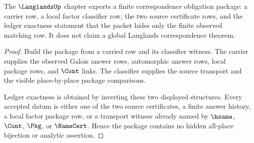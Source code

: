 \begin{theorem}
\label{thm:langlands-correspondence-obligation-package}
The $\LanglandsUp$ chapter exports a finite correspondence obligation package: a carrier row, a local factor classifier row, the two source certificate rows, and the ledger exactness statement that the packet hides only the finite observed matching row. It does not claim a global Langlands correspondence theorem.
\end{theorem}
\begin{proof}
Build the package from a carried row and its classifier witness. The carrier supplies the observed Galois answer rows, automorphic answer rows, local package rows, and $\Cont$ links. The classifier supplies the source transport and the visible place-by-place package comparisons.

Ledger exactness is obtained by inverting these two displayed structures. Every accepted datum is either one of the two source certificates, a finite answer history, a local factor package row, or a transport witness already named by $\hsame$, $\Cont$, $\Pkg$, or $\NameCert$. Hence the package contains no hidden all-place bijection or analytic assertion.
\end{proof}


